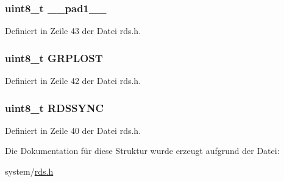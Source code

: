 \subsubsection[{\+\_\+\+\_\+pad1\+\_\+\+\_\+}]{\setlength{\rightskip}{0pt plus 5cm}uint8\+\_\+t \+\_\+\+\_\+pad1\+\_\+\+\_\+}\label{structsync_a77f12d2e278bd5c07712648ac0df5e08}


Definiert in Zeile 43 der Datei rds.\+h.

\hypertarget{structsync_a430b332cff3a3786c4854defcd95d078}{}
\subsubsection[{G\+R\+P\+L\+O\+S\+T}]{\setlength{\rightskip}{0pt plus 5cm}uint8\+\_\+t G\+R\+P\+L\+O\+S\+T}\label{structsync_a430b332cff3a3786c4854defcd95d078}


Definiert in Zeile 42 der Datei rds.\+h.

\hypertarget{structsync_acdf4253982980384be3340fd9a9ab7c5}{}
\subsubsection[{R\+D\+S\+S\+Y\+N\+C}]{\setlength{\rightskip}{0pt plus 5cm}uint8\+\_\+t R\+D\+S\+S\+Y\+N\+C}\label{structsync_acdf4253982980384be3340fd9a9ab7c5}


Definiert in Zeile 40 der Datei rds.\+h.



Die Dokumentation für diese Struktur wurde erzeugt aufgrund der Datei\+:\begin{DoxyCompactItemize}
\item 
system/\hyperlink{rds_8h}{rds.\+h}\end{DoxyCompactItemize}
